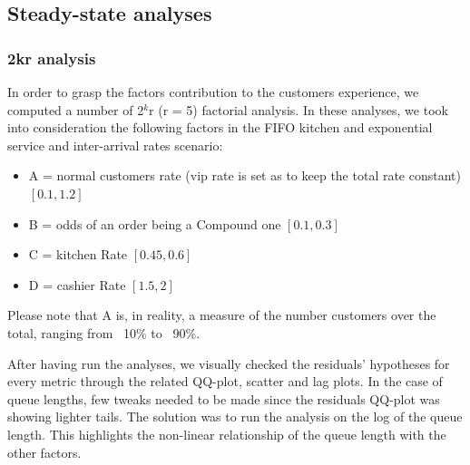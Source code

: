 \subsection{Steady-state analyses}

\subsubsection{2kr analysis}\label{sec:2kr}
In order to grasp the factors contribution to the customers experience, we computed a number of 2$^k$r (r = 5) factorial analysis. In these analyses, we took into 
consideration the following factors in the FIFO kitchen and exponential service and inter-arrival rates scenario: 
\begin{itemize}
  \item A = normal customers rate (vip rate is set as to keep the total rate constant) $[0.1, 1.2]$
  \item B = odds of an order being a Compound one $[0.1, 0.3]$
  \item C = kitchen Rate $[0.45, 0.6]$
  \item D = cashier Rate $[1.5, 2]$
\end{itemize}
Please note that A is, in reality, a measure of the number customers 
over the total, ranging from ~10\% to ~90\%.

After having run the analyses, we visually checked the residuals' hypotheses for every metric through the related QQ-plot, scatter and lag plots. In the case of queue lengths, few tweaks needed to be made since the residuals QQ-plot was showing lighter tails. The solution was to run the analysis on the log of the queue length. This highlights the non-linear relationship of the queue length with the other factors.

